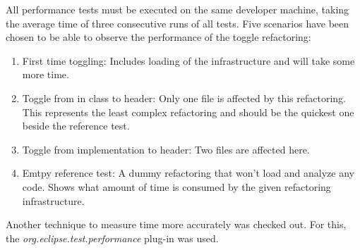 All performance tests must be executed on the same developer machine, taking the 
average time of three consecutive runs of all tests. Five scenarios have been 
chosen to be able to observe the performance of the toggle refactoring:

\begin{enumerate}
\item First time toggling: Includes loading of the infrastructure and will take 
some more time.
\item Toggle from in class to header: Only one file is affected by this 
refactoring. This represents the least complex refactoring and should be the 
quickest one beside the reference test.
\item Toggle from implementation to header: Two files are affected here.
\item Emtpy reference test: A dummy refactoring that won't load and analyze any 
code. Shows what amount of time is consumed by the given refactoring 
infrastructure.
\end{enumerate}

Another technique to measure time more accurately was checked out. For this, the 
\textit{org.eclipse.test.performance} plug-in was used.
